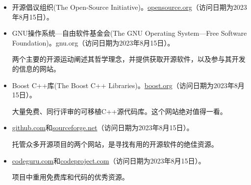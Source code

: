 \begin{itemize}
\item
开源倡议组织(The Open-Source Initiative)。\url{opensource.org}（访问日期为2023年8月15日）。

\item
GNU操作系统—自由软件基金会(The GNU Operating System—Free Software Foundation)。gnu.org（访问日期为2023年8月15日）。

\hspace*{\fill}

两个主要的开源运动阐述其哲学理念，并提供获取开源软件，以及参与其开发的信息的网站。

\hspace*{\fill}

\item
Boost C++库(The Boost C++ Libraries)。\url{boost.org}（访问日期为2023年8月15日）。

\hspace*{\fill}

大量免费、同行评审的可移植C++源代码库。这个网站绝对值得一看。

\hspace*{\fill}

\item
\url{github.com}和\url{sourceforge.net}（访问日期为2023年8月15日）。

\hspace*{\fill}

托管众多开源项目的两个网站，是寻找有用的开源软件的绝佳资源。

\hspace*{\fill}

\item
\url{codeguru.com}和\url{codeproject.com}（访问日期为2023年8月15日）。

\hspace*{\fill}

项目中重用免费库和代码的优秀资源。
\end{itemize}